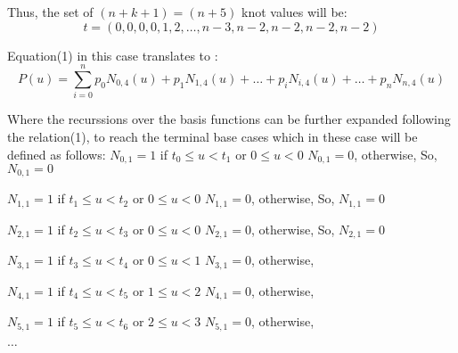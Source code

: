 \documentclass{article}
\begin{document}
Thus, the set of $(n+k+1) = (n+5)$ knot values will be: \newline
\[ t = (0,0,0,0,1,2, \dots, n-3, n-2,n-2,n-2,n-2)\]

Equation(1) in this case translates to : \newline
\begin{equation}
 P(u) = \sum_{i=0}^n p_0 N_{0,4}(u) + p_1 N_{1,4}(u) + \dots + p_i N_{i,4}(u) + \dots + p_n N_{n,4}(u) 
\end{equation}

Where the recurssions over the basis functions can be further expanded following the relation(1), to reach the terminal base cases which in these case will be defined as follows: \newline
$N_{0,1} = 1 $ if $t_0 \leq u < t_1$ or $0 \leq u < 0$ \newline
$N_{0,1} = 0$, otherwise, \newline
So, $N_{0,1} = 0$ \newline \newline

$N_{1,1} = 1 $ if $t_1 \leq u < t_2$ or $0 \leq u < 0$ \newline
$N_{1,1} = 0$, otherwise, \newline
So, $N_{1,1} = 0$ \newline \newline

$N_{2,1} = 1 $ if $t_2 \leq u < t_3$ or $0 \leq u < 0$ \newline
$N_{2,1} = 0$, otherwise, \newline
So, $N_{2,1} = 0$ \newline \newline

$N_{3,1} = 1$ if $t_3 \leq u < t_4$ or $0 \leq u < 1$ \newline
$N_{3,1} = 0$, otherwise, \newline \newline

$N_{4,1} = 1$ if $t_4 \leq u < t_5$ or $1 \leq u < 2$ \newline
$N_{4,1} = 0$, otherwise, \newline \newline

$N_{5,1} = 1$ if $t_5 \leq u < t_6$ or $2 \leq u < 3$ \newline
$N_{5,1} = 0$, otherwise, \newline 

$\dots$ \newline
\end{document}
